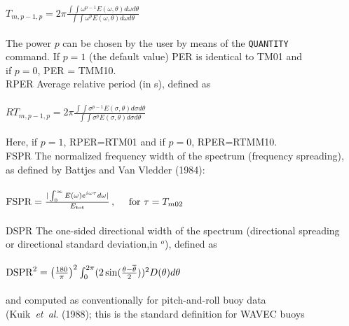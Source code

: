 \documentclass[12pt]{book}
\begin{document}
\begin{tabbing}
                        \\
$T_{m,p-1,p} = 2\pi \frac{\int \int \omega^{p-1} E(\omega, \theta) d\omega d\theta}{\int \int \omega^p E(\omega, \theta) d\omega d\theta}$ \\
                        \\
                        The power $p$ can be chosen by the user by means of the {\tt QUANTITY}\\
                        command. If $p=1$ (the default value) PER is identical to TM01 and\\
                        if $p=0$, PER = TMM10.\-\\
RPER                 \> Average relative period (in s), defined as\+\\
                        \\
$RT_{m,p-1,p} = 2\pi \frac{\int \int \sigma^{p-1} E(\sigma, \theta) d\sigma d\theta}{\int \int \sigma^p E(\sigma, \theta) d\sigma d\theta}$ \\
                        \\
                        Here, if $p=1$, RPER=RTM01 and if $p=0$, RPER=RTMM10.\-\\
FSPR                 \> The normalized frequency width of the spectrum (frequency spreading),\+\\
                        as defined by Battjes and Van Vledder (1984):\\
                        \\
${\rm FSPR} = \frac{|\int_{0}^{\infty} E(\omega) e^{i\omega \tau}d\omega|}{E_{\rm tot}} \, , \quad \, \, {\rm for} \, \, \tau = T_{m02}$ \\
                        \-\\
DSPR                 \> The one-sided directional width of the spectrum (directional spreading\+\\
                        or directional standard deviation,in $^o$), defined as\\
                        \\
${\rm DSPR}^2 = \left( \frac{180}{\pi} \right)^2 \int_{0}^{2\pi} (2 \sin (\frac{\theta-\overline{\theta}}{2}))^2 D(\theta) d\theta$ \\
                        \\
                        and computed as conventionally for pitch-and-roll buoy data\\
                        (Kuik~{\it et~al}. (1988); this is the standard definition for WAVEC buoys\\

\end{tabbing}
\end{document}
